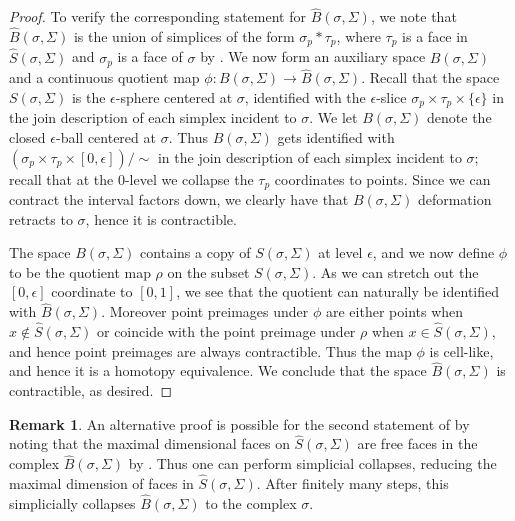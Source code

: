 \documentclass[12pt, letterpaper]{article}
\theoremstyle{plain}
\theoremstyle{definition}
\newtheorem{rmk}[thm]{Remark}
\begin{document}
\begin{proof}
To verify the corresponding statement for $\hat B(\sigma, \Sigma)$, we note that $\hat B(\sigma, \Sigma)$ is the union of simplices of the form $\sigma_p * \tau_p$, where $\tau_p$ is a face in $\hat S(\sigma, \Sigma)$ and $\sigma_p$ is a face of $\sigma$ by . We now form an auxiliary space $B(\sigma, \Sigma)$ and a continuous quotient map $\phi \colon B(\sigma, \Sigma) \rightarrow \hat B(\sigma, \Sigma)$. Recall that the space $S(\sigma, \Sigma)$ is the $\epsilon$-sphere centered at $\sigma$, identified with the $\epsilon$-slice $\sigma_p \times \tau_p \times \{\epsilon\}$ in the join description of each simplex incident to $\sigma$. We let $B(\sigma, \Sigma)$ denote the closed $\epsilon$-ball centered at $\sigma$. Thus $B(\sigma, \Sigma)$ gets identified with $(\sigma_p \times \tau_p \times [0, \epsilon])/\sim$ in the join description of each simplex incident to $\sigma$; recall that at the $0$-level we collapse the $\tau_p$ coordinates to points. Since we can contract the interval factors down, we clearly have that $B(\sigma, \Sigma)$ deformation retracts to $\sigma$, hence it is contractible. 

The space $B(\sigma, \Sigma)$ contains a copy of $S(\sigma, \Sigma)$ at level $\epsilon$, and we now define $\phi$ to be the quotient map $\rho$ on the subset $S(\sigma, \Sigma)$. As we can stretch out the $[0, \epsilon]$ coordinate to $[0,1]$, we see that the quotient can naturally be identified with $\hat B(\sigma, \Sigma)$. Moreover point preimages under $\phi$ are either points when $x\notin \hat S(\sigma, \Sigma)$ or coincide with the point preimage under $\rho$ when $x\in \hat S(\sigma, \Sigma)$, and hence point preimages are always contractible. Thus the map $\phi$ is cell-like, and hence it is a homotopy equivalence. We conclude that the space $\hat B(\sigma, \Sigma)$ is contractible, as desired.
\end{proof}

\begin{rmk}
An alternative proof is possible for the second statement of  by noting that the maximal dimensional faces on $\hat S(\sigma, \Sigma)$ are free faces in the complex $\hat B(\sigma, \Sigma)$ by . Thus one can perform simplicial collapses, reducing the maximal dimension of faces in $\hat S(\sigma, \Sigma)$. After finitely many steps, this simplicially collapses $\hat B(\sigma, \Sigma)$ to the complex $\sigma$. 
\end{rmk}
\end{document}
